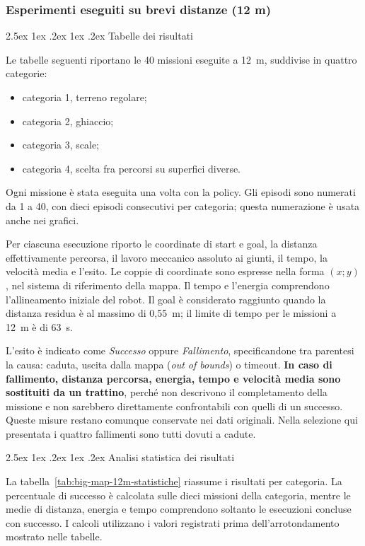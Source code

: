 \documentclass[11pt,a4paper]{article}
\makeatletter
\newcommand{\subsubsubsection}{%
  \@startsection{paragraph}{4}{\z@}%
  {2.5ex \@plus 1ex \@minus .2ex}%
  {1ex \@plus .2ex}%
  {\normalfont\normalsize\bfseries}}
\makeatother
\begin{document}
\subsubsection{Esperimenti eseguiti su brevi distanze (12 m)}
\label{sec:risultati-big-map-12m}

\subsubsubsection{Tabelle dei risultati}

Le tabelle seguenti riportano le 40 missioni eseguite a 12~m, suddivise in quattro categorie:
\begin{itemize}
\item categoria 1, terreno regolare;
\item categoria 2, ghiaccio;
\item categoria 3, scale;
\item categoria 4, scelta fra percorsi su superfici diverse.
\end{itemize}

Ogni missione è stata eseguita una volta con la policy. Gli episodi sono numerati da 1 a 40, con dieci episodi consecutivi per categoria; questa numerazione è usata anche nei grafici.

Per ciascuna esecuzione riporto le coordinate di start e goal, la distanza effettivamente percorsa, il lavoro meccanico assoluto ai giunti, il tempo, la velocità media e l'esito. Le coppie di coordinate sono espresse nella forma $(x;y)$, nel sistema di riferimento della mappa. Il tempo e l'energia comprendono l'allineamento iniziale del robot. Il goal è considerato raggiunto quando la distanza residua è al massimo di 0,55~m; il limite di tempo per le missioni a 12~m è di 63~s.

L'esito è indicato come \textit{Successo} oppure \textit{Fallimento}, specificandone tra parentesi la causa: caduta, uscita dalla mappa (\textit{out of bounds}) o timeout. \textbf{In caso di fallimento, distanza percorsa, energia, tempo e velocità media sono sostituiti da un trattino}, perché non descrivono il completamento della missione e non sarebbero direttamente confrontabili con quelli di un successo. Queste misure restano comunque conservate nei dati originali. Nella selezione qui presentata i quattro fallimenti sono tutti dovuti a cadute.



\subsubsubsection{Analisi statistica dei risultati}

La tabella~\ref{tab:big-map-12m-statistiche} riassume i risultati per categoria.
La percentuale di successo è calcolata sulle dieci missioni della categoria, mentre le medie di distanza, energia e tempo comprendono soltanto le esecuzioni concluse con successo.
I calcoli utilizzano i valori registrati prima dell'arrotondamento mostrato nelle tabelle.
\end{document}
